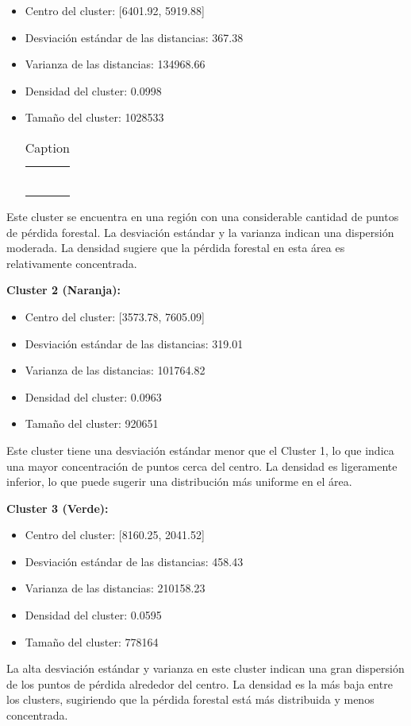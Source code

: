 \documentclass[11pt]{article}
\begin{document}
    \begin{itemize}
        \item Centro del cluster: [6401.92, 5919.88]
        \item Desviación estándar de las distancias: 367.38
        \item Varianza de las distancias: 134968.66
        \item Densidad del cluster: 0.0998
        \item Tamaño del cluster: 1028533

    \begin{table}
        \centering
        \begin{tabular}{cc}
             & \\
             & \\
             & \\
             & \\
             & \\
             & \\
        \end{tabular}
        \caption{Caption}
        \label{tab:my_label}
    \end{table}
        \end{itemize}
Este cluster se encuentra en una región con una considerable cantidad de puntos de pérdida forestal. 
La desviación estándar y la varianza indican una dispersión moderada.
La densidad sugiere que la pérdida forestal en esta área es relativamente concentrada.

\textbf{Cluster 2 (Naranja):}
    \begin{itemize}
        \item Centro del cluster: [3573.78, 7605.09]
        \item Desviación estándar de las distancias: 319.01
        \item Varianza de las distancias: 101764.82
        \item Densidad del cluster: 0.0963
        \item Tamaño del cluster: 920651
    \end{itemize}
Este cluster tiene una desviación estándar menor que el Cluster 1, lo que indica una mayor concentración de puntos cerca del centro. La densidad es ligeramente inferior, lo que puede sugerir una distribución más uniforme en el área.

\textbf{Cluster 3 (Verde):}
    \begin{itemize}
        \item Centro del cluster: [8160.25, 2041.52]
        \item Desviación estándar de las distancias: 458.43
        \item Varianza de las distancias: 210158.23
        \item Densidad del cluster: 0.0595
        \item Tamaño del cluster: 778164
    \end{itemize}
 La alta desviación estándar y varianza en este cluster indican una gran dispersión de los puntos de pérdida alrededor del centro. La densidad es la más baja entre los clusters, sugiriendo que la pérdida forestal está más distribuida y menos concentrada.
 
\end{document}
